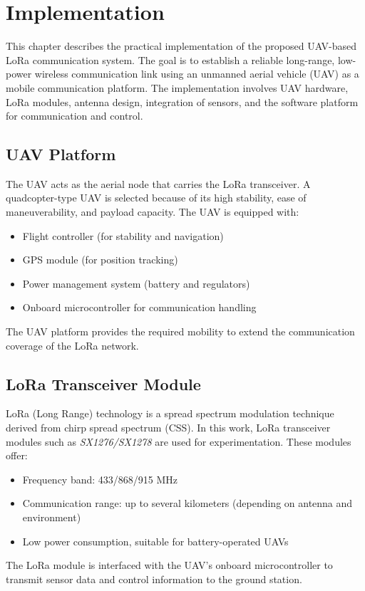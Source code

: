 \chapter{Implementation} 

This chapter describes the practical implementation of the proposed UAV-based LoRa communication system. The goal is to establish a reliable long-range, low-power wireless communication link using an unmanned aerial vehicle (UAV) as a mobile communication platform. The implementation involves UAV hardware, LoRa modules, antenna design, integration of sensors, and the software platform for communication and control.  

\section{UAV Platform}  
The UAV acts as the aerial node that carries the LoRa transceiver. A quadcopter-type UAV is selected because of its high stability, ease of maneuverability, and payload capacity. The UAV is equipped with:  
\begin{itemize}
    \item Flight controller (for stability and navigation)  
    \item GPS module (for position tracking)  
    \item Power management system (battery and regulators)  
    \item Onboard microcontroller for communication handling  
\end{itemize}  
The UAV platform provides the required mobility to extend the communication coverage of the LoRa network.  

\section{LoRa Transceiver Module}  
LoRa (Long Range) technology is a spread spectrum modulation technique derived from chirp spread spectrum (CSS). In this work, LoRa transceiver modules such as \textit{SX1276/SX1278} are used for experimentation. These modules offer:  
\begin{itemize}
    \item Frequency band: 433/868/915 MHz  
    \item Communication range: up to several kilometers (depending on antenna and environment)  
    \item Low power consumption, suitable for battery-operated UAVs  
\end{itemize}  
The LoRa module is interfaced with the UAV’s onboard microcontroller to transmit sensor data and control information to the ground station.  

